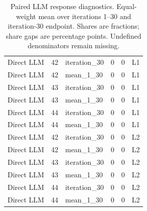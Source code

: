 \begin{table}[htbp!]
\begin{tabular}{lrlrrl}
Direct LLM & 42 & iteration\_30 & 0 & 0 & L1 \\
Direct LLM & 42 & mean\_1\_30 & 0 & 0 & L1 \\
Direct LLM & 43 & iteration\_30 & 0 & 0 & L1 \\
Direct LLM & 43 & mean\_1\_30 & 0 & 0 & L1 \\
Direct LLM & 44 & iteration\_30 & 0 & 0 & L1 \\
Direct LLM & 44 & mean\_1\_30 & 0 & 0 & L1 \\
Direct LLM & 42 & iteration\_30 & 0 & 0 & L2 \\
Direct LLM & 42 & mean\_1\_30 & 0 & 0 & L2 \\
Direct LLM & 43 & iteration\_30 & 0 & 0 & L2 \\
Direct LLM & 43 & mean\_1\_30 & 0 & 0 & L2 \\
Direct LLM & 44 & iteration\_30 & 0 & 0 & L2 \\
Direct LLM & 44 & mean\_1\_30 & 0 & 0 & L2 \\
\hline
\end{tabular}
\caption{Paired LLM response diagnostics. Equal-weight mean over iterations 1--30 and iteration-30 endpoint. Shares are fractions; share gaps are percentage points. Undefined denominators remain missing.}
\label{chap:results:tab:rq2_llm_excluded_pairs}
\end{table}
